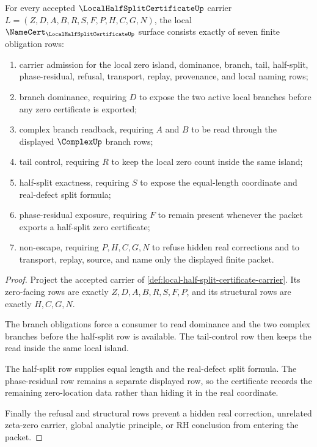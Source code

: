 \begin{theorem}
\label{thm:local-half-split-certificate-namecert-obligations}
For every accepted $\LocalHalfSplitCertificateUp$ carrier $L=(Z,D,A,B,R,S,F,P,H,C,G,N)$, the local $\NameCert_{\LocalHalfSplitCertificateUp}$ surface consists exactly of seven finite obligation rows:
\begin{enumerate}
\item carrier admission for the local zero island, dominance, branch, tail, half-split, phase-residual, refusal, transport, replay, provenance, and local naming rows;
\item branch dominance, requiring $D$ to expose the two active local branches before any zero certificate is exported;
\item complex branch readback, requiring $A$ and $B$ to be read through the displayed $\ComplexUp$ branch rows;
\item tail control, requiring $R$ to keep the local zero count inside the same island;
\item half-split exactness, requiring $S$ to expose the equal-length coordinate and real-defect split formula;
\item phase-residual exposure, requiring $F$ to remain present whenever the packet exports a half-split zero certificate;
\item non-escape, requiring $P,H,C,G,N$ to refuse hidden real corrections and to transport, replay, source, and name only the displayed finite packet.
\end{enumerate}
\end{theorem}
\begin{proof}
Project the accepted carrier of \autoref{def:local-half-split-certificate-carrier}. Its zero-facing rows are exactly $Z,D,A,B,R,S,F,P$, and its structural rows are exactly $H,C,G,N$.

The branch obligations force a consumer to read dominance and the two complex branches before the half-split row is available. The tail-control row then keeps the read inside the same local island.

The half-split row supplies equal length and the real-defect split formula. The phase-residual row remains a separate displayed row, so the certificate records the remaining zero-location data rather than hiding it in the real coordinate.

Finally the refusal and structural rows prevent a hidden real correction, unrelated zeta-zero carrier, global analytic principle, or RH conclusion from entering the packet.
\end{proof}

